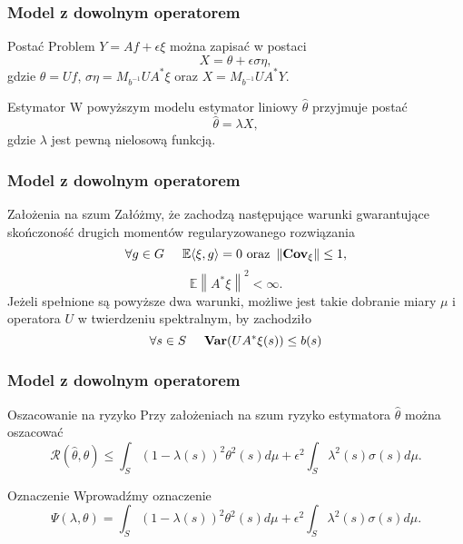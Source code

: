 \documentclass{beamer}
\newcommand{\norm}[1]{\left\lVert#1\right\rVert}
\begin{document}
\begin{frame}\frametitle{Model z dowolnym operatorem}
\begin{block}{Postać}
Problem $Y=Af+\epsilon\xi$ można zapisać w postaci
\begin{displaymath}
X=\theta +\epsilon\sigma\eta,
\end{displaymath}
gdzie $\theta =Uf$, $\sigma\eta = M_{b^{-1}}UA^*\xi$ oraz $X = M_{b^{-1}}UA^*Y$.
\end{block}
\begin{block}{Estymator}
W powyższym modelu estymator liniowy $\hat{\theta}$ przyjmuje postać 
\begin{displaymath}
\hat{\theta}=\lambda X,
\end{displaymath}
gdzie $\lambda$ jest pewną nielosową funkcją. 
\end{block}
\end{frame}


\begin{frame}\frametitle{Model z dowolnym operatorem}
\begin{block}{Założenia na szum}
Załóżmy, że zachodzą następujące warunki gwarantujące skończoność drugich momentów regularyzowanego rozwiązania
\begin{displaymath}
\forall g\in G\hspace{0.5cm}  \mathbb{E}\langle \xi, g\rangle =0\textrm{ oraz }\norm{\textbf{Cov}_{\xi}}\leq 1,
\end{displaymath}
\begin{displaymath}
\mathbb{E}\norm{A^*\xi}^2<\infty.
\end{displaymath}
Jeżeli spełnione są powyższe dwa warunki, możliwe jest takie dobranie miary $\mu$ i  operatora $U$ w twierdzeniu spektralnym, by zachodziło
\begin{displaymath}
\forall s\in S\hspace{0.5cm} \textbf{Var}(UA^*\xi (s))\leq b(s)
\end{displaymath}
\end{block}
\end{frame}


\begin{frame}\frametitle{Model z dowolnym operatorem}
\begin{block}{Oszacowanie na ryzyko}
Przy założeniach na szum ryzyko estymatora $\hat{\theta}$ można oszacować 
\begin{displaymath}
\mathcal{R}(\hat{\theta},\theta ) \leq \int_S(1-\lambda(s))^2\theta^2(s)d\mu+\epsilon^2\int_S\lambda^2(s)\sigma(s)d\mu.
\end{displaymath}
\end{block}
\begin{block}{Oznaczenie}
Wprowadźmy oznaczenie 
\begin{displaymath}
\Psi(\lambda,\theta) = \int_S(1-\lambda(s))^2\theta^2(s)d\mu+\epsilon^2\int_S\lambda^2(s)\sigma(s)d\mu.
\end{displaymath}
\end{block}
\end{frame}
\end{document}
